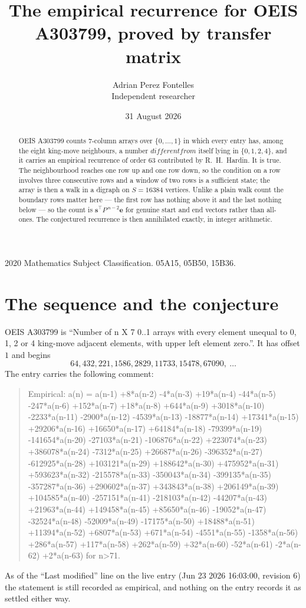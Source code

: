 \documentclass[11pt,a4paper]{article}
\title{The empirical recurrence for OEIS A303799, proved by transfer matrix}
\author{Adrian Perez Fontelles\\ \small Independent researcher}
\date{31 August 2026}
\theoremstyle{plain}
\theoremstyle{definition}
\begin{document}
\maketitle

\begin{abstract}
OEIS A303799 counts $7$-column arrays over $\{0,\dots,1\}$ in which every entry has,
among the eight king-move neighbours, a number $different from$ itself lying in $\{0,1,2,4\}$, and it carries an empirical
recurrence of order $63$ contributed by R.~H.~Hardin. It is true. The neighbourhood
reaches one row up and one row down, so the condition on a row involves three consecutive
rows and a window of two rows is a sufficient state; the array is then a walk in a digraph
on $S=16384$ vertices. Unlike a plain walk count the boundary rows matter here --- the first
row has nothing above it and the last nothing below --- so the count is
$\mathbf{s}^{\!\top}P^{\,n-2}\mathbf{e}$ for genuine start and end vectors rather than
all-ones. The conjectured recurrence is then annihilated exactly, in integer arithmetic.
\end{abstract}

\noindent\small 2020 Mathematics Subject Classification. 05A15, 05B50, 15B36.\normalsize

\section{The sequence and the conjecture}

OEIS A303799 is ``Number of n X 7 0..1 arrays with every element unequal to 0, 1, 2 or 4 king-move adjacent elements, with upper left element zero.''. It has offset
$1$ and begins
\[
64, 432, 221, 1586, 2829, 11733, 15478, 67090,\ \dots
\]
The entry carries the following comment:
\begin{quote}\small
Empirical: a(n) = a(n-1) +8*a(n-2) -4*a(n-3) +19*a(n-4) -44*a(n-5) -247*a(n-6) +152*a(n-7) +18*a(n-8) +644*a(n-9) +3018*a(n-10) -2233*a(n-11) -2900*a(n-12) -4539*a(n-13) -18877*a(n-14) +17341*a(n-15) +29206*a(n-16) +16650*a(n-17) +64184*a(n-18) -79399*a(n-19) -141654*a(n-20) -27103*a(n-21) -106876*a(n-22) +223074*a(n-23) +386078*a(n-24) -7312*a(n-25) +26687*a(n-26) -396352*a(n-27) -612925*a(n-28) +103121*a(n-29) +188642*a(n-30) +475952*a(n-31) +593623*a(n-32) -215578*a(n-33) -350043*a(n-34) -399135*a(n-35) -357287*a(n-36) +290602*a(n-37) +343843*a(n-38) +206149*a(n-39) +104585*a(n-40) -257151*a(n-41) -218103*a(n-42) -44207*a(n-43) +21963*a(n-44) +149458*a(n-45) +85650*a(n-46) -19052*a(n-47) -32524*a(n-48) -52009*a(n-49) -17175*a(n-50) +18488*a(n-51) +11394*a(n-52) +6807*a(n-53) +671*a(n-54) -4551*a(n-55) -1358*a(n-56) +286*a(n-57) +117*a(n-58) +262*a(n-59) +32*a(n-60) -52*a(n-61) -2*a(n-62) +2*a(n-63) for n>71.
\end{quote}
As of the ``Last modified'' line on the live entry (Jun 23 2026 16:03:00, revision
6) the statement is still recorded as empirical, and nothing on the entry
records it as settled either way.
\end{document}
